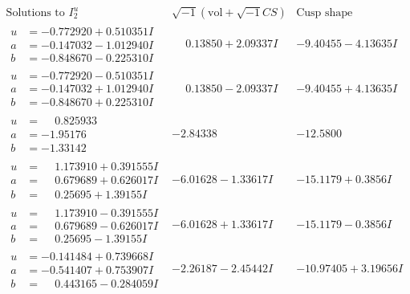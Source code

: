 \documentclass[1p]{elsarticle_modified}
\theoremstyle{definition}
\newcommand{\I}{\sqrt{-1}}
\begin{document}
$$\begin{array}{c|c|c}  
\text{Solutions to }I^u_{2}& \I (\text{vol} + \sqrt{-1}CS) & \text{Cusp shape}\\
 \hline 
\begin{aligned}
u &= -0.772920 + 0.510351 I \\
a &= -0.147032 - 1.012940 I \\
b &= -0.848670 - 0.225310 I\end{aligned}
 & \phantom{-}0.13850 + 2.09337 I & -9.40455 - 4.13635 I \\ \hline\begin{aligned}
u &= -0.772920 - 0.510351 I \\
a &= -0.147032 + 1.012940 I \\
b &= -0.848670 + 0.225310 I\end{aligned}
 & \phantom{-}0.13850 - 2.09337 I & -9.40455 + 4.13635 I \\ \hline\begin{aligned}
u &= \phantom{-}0.825933\phantom{ +0.000000I} \\
a &= -1.95176\phantom{ +0.000000I} \\
b &= -1.33142\phantom{ +0.000000I}\end{aligned}
 & -2.84338\phantom{ +0.000000I} & -12.5800\phantom{ +0.000000I} \\ \hline\begin{aligned}
u &= \phantom{-}1.173910 + 0.391555 I \\
a &= \phantom{-}0.679689 + 0.626017 I \\
b &= \phantom{-}0.25695 + 1.39155 I\end{aligned}
 & -6.01628 - 1.33617 I & -15.1179 + 0.3856 I \\ \hline\begin{aligned}
u &= \phantom{-}1.173910 - 0.391555 I \\
a &= \phantom{-}0.679689 - 0.626017 I \\
b &= \phantom{-}0.25695 - 1.39155 I\end{aligned}
 & -6.01628 + 1.33617 I & -15.1179 - 0.3856 I \\ \hline\begin{aligned}
u &= -0.141484 + 0.739668 I \\
a &= -0.541407 + 0.753907 I \\
b &= \phantom{-}0.443165 - 0.284059 I\end{aligned}
 & -2.26187 - 2.45442 I & -10.97405 + 3.19656 I \\ \hline\begin{aligned}

\end{aligned}
\end{array}$$
\end{document}
